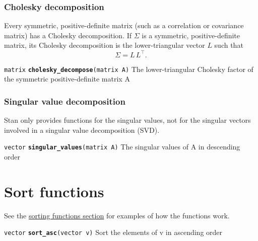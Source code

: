 \documentclass[
  10pt,
]{book}
\begin{document}
\hypertarget{cholesky-decomposition}{%
\subsubsection{Cholesky decomposition}\label{cholesky-decomposition}}

Every symmetric, positive-definite matrix (such as a correlation or
covariance matrix) has a Cholesky decomposition. If \(\Sigma\) is a
symmetric, positive-definite matrix, its Cholesky decomposition is the
lower-triangular vector \(L\) such that \[ \Sigma = L \, L^{\top}. \]


\texttt{matrix} \textbf{\texttt{cholesky\_decompose}}\texttt{(matrix\ A)}\newline
The lower-triangular Cholesky factor of the symmetric
positive-definite matrix A

\hypertarget{singular-value-decomposition}{%
\subsubsection{Singular value decomposition}\label{singular-value-decomposition}}

Stan only provides functions for the singular values, not for the
singular vectors involved in a singular value decomposition (SVD).


\texttt{vector} \textbf{\texttt{singular\_values}}\texttt{(matrix\ A)}\newline
The singular values of A in descending order

\hypertarget{sort-functions}{%
\section{Sort functions}\label{sort-functions}}

See the \protect\hyperlink{sorting-functions}{sorting functions section} for examples of how
the functions work.


\texttt{vector} \textbf{\texttt{sort\_asc}}\texttt{(vector\ v)}\newline
Sort the elements of v in ascending order

\end{document}
